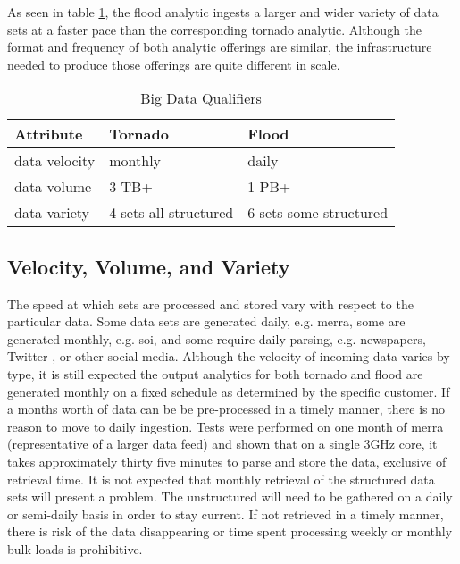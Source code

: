 As seen in table \ref{qualifiers},  the flood analytic ingests a larger and wider variety of data sets at a faster pace than the corresponding tornado analytic. Although the format and frequency of both analytic offerings are similar, the infrastructure needed to produce those offerings are quite different in scale.
\begin{table}[htbp]
    \centering
    \begin{tabular}{l l l}
        \hline
        Attribute & Tornado & Flood\\ [0.5ex]
        \hline
        data velocity & monthly & daily\\
        data volume &  3 TB+  & 1 PB+\\
        data variety &  4 sets all structured & 6 sets some structured\\
        \hline
    \end{tabular}
    \caption{Big Data Qualifiers}
    \label{qualifiers}
\end{table}
\subsection{Velocity, Volume, and Variety}
The speed at which sets are processed and stored vary with respect to the particular data. Some data sets are generated daily, e.g. \gls{merra}, some are generated monthly, e.g. \gls{soi}, and some require daily parsing, e.g. newspapers, Twitter , or other social media. Although the velocity of incoming data varies by type, it is still expected the output analytics for both tornado and flood are generated monthly on a fixed schedule as determined by the specific customer. If a months worth of data can be be pre-processed in a timely manner, there is no reason to move to daily ingestion. Tests were performed on one month of  \gls{merra} (representative of a larger data feed) and shown that on a single 3GHz core, it takes approximately thirty five minutes to parse and store the data, exclusive of retrieval time. It is not expected that monthly retrieval of the structured data sets will present a problem. The unstructured will need to be gathered  on a daily or semi-daily basis in order to stay current. If not retrieved in a timely manner, there is risk of the data disappearing or time spent processing weekly or monthly bulk loads is prohibitive.\\

